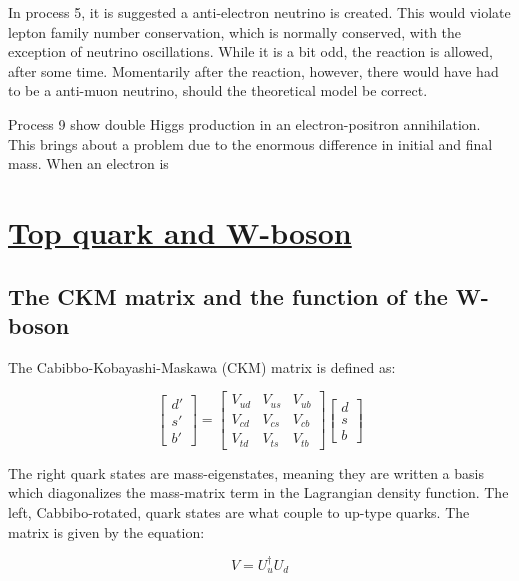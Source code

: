 \documentclass[11pt,a4paper]{article}
\begin{document}
In process 5, it is suggested a anti-electron neutrino is created. This would violate lepton family number conservation, which is normally conserved, with the exception of neutrino oscillations. While it is a bit odd, the reaction is allowed, after some time. Momentarily after the reaction, however, there would have had to be a anti-muon neutrino, should the theoretical model be correct.

Process 9 show double Higgs production in an electron-positron annihilation. This brings about a problem due to the enormous difference in initial and final mass. When an electron is 

\section{\underline{Top quark and W-boson}}
\subsection{The CKM matrix and the function of the W-boson}
The Cabibbo-Kobayashi-Maskawa (CKM) matrix is defined as:


\begin{equation}
\begin{bmatrix}
d' \\ s' \\ b'
\end{bmatrix} =
\begin{bmatrix}
V_{ud} & V_{us} & V_{ub} \\
V_{cd} & V_{cs} & V_{cb} \\
V_{td} & V_{ts} & V_{tb}
\end{bmatrix}
\begin{bmatrix}
d \\ s \\ b
\end{bmatrix}
\label{CKM_matrix}
\end{equation}

The right quark states are mass-eigenstates, meaning they are written a basis which diagonalizes the mass-matrix term in the Lagrangian density function. The left, Cabbibo-rotated, quark states are what couple to up-type quarks. The matrix is given by the equation:

\begin{equation}
V = U_u^\dagger U_d
\end{equation}
\end{document}
